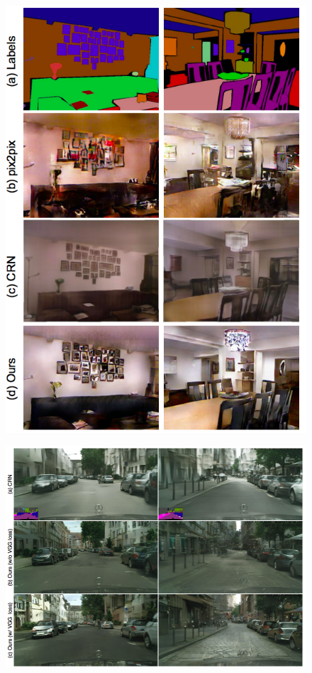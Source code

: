 \documentclass{beamer}
\begin{document}
\begin{frame}
\begin{figure}
	\centering
	\includegraphics[height=0.45\textheight]{images/result_2}
\end{figure}
\end{frame}

\begin{frame}
\begin{figure}
	\centering
	\includegraphics[height=0.45\textheight]{images/result_3}
\end{figure}
\end{frame}
\end{document}
